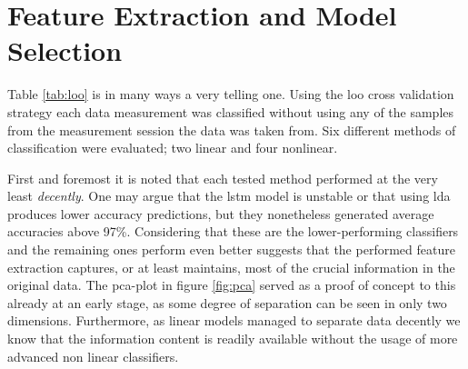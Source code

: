 







\section{Feature Extraction and Model Selection}
\label{disc_feat}
Table \ref{tab:loo} is in many ways a very telling one. Using the \gls{loo} cross validation strategy each data measurement was classified without using any of the samples from the measurement session the data was taken from. Six different methods of classification were evaluated; two linear and four nonlinear. 

First and foremost it is noted that each tested method performed at the very least \emph{decently}. One may argue that the \gls{lstm} model is unstable or that using \gls{lda} produces lower accuracy predictions, but they nonetheless generated average accuracies above 97\%. Considering that these are the lower-performing classifiers and the remaining ones perform even better suggests that the performed feature extraction captures, or at least maintains, most of the crucial information in the original data. The \gls{pca}-plot in figure \ref{fig:pca} served as a proof of concept to this already at an early stage, as some degree of separation can be seen in only two dimensions. Furthermore, as linear models managed to separate data decently we know that the information content is readily available without the usage of more advanced non linear classifiers.  

